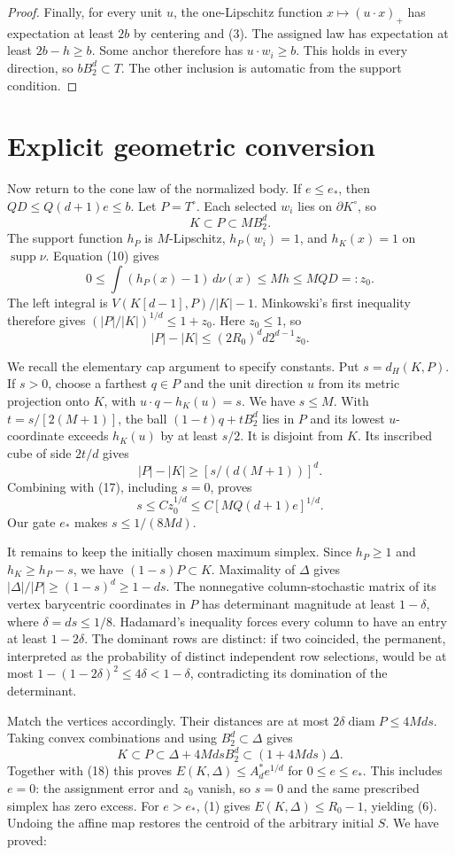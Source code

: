 \documentclass[11pt]{article}
\newcommand{\supp}{\operatorname{supp}}
\newcommand{\B}{B_2^d}
\newcommand{\pos}[1]{(#1)_+}
\begin{document}
\begin{proof}
Finally, for every unit $u$, the one-Lipschitz function $x\mapsto\pos{u\cdot x}$
has expectation at least $2b$ by centering and (3). The assigned law has
expectation at least $2b-h\ge b$. Some anchor therefore has $u\cdot w_i\ge b$.
This holds in every direction, so $b\B\subset T$. The other inclusion is
automatic from the support condition.
\end{proof}

\section{Explicit geometric conversion}

Now return to the cone law of the normalized body. If $e\le e_*$, then
$QD\le Q(d+1)e\le b$. Let $P=T^\circ$. Each selected $w_i$ lies on
$\partial K^\circ$, so
\[
 K\subset P\subset M\B.
 \tag{15}
\]
The support function $h_P$ is $M$-Lipschitz, $h_P(w_i)=1$, and
$h_K(x)=1$ on $\supp\nu$. Equation (10) gives
\[
 0\le\int(h_P(x)-1)\,d\nu(x)\le Mh\le MQD=:z_0.
 \tag{16}
\]
The left integral is $V(K[d-1],P)/|K|-1$. Minkowski's first inequality
therefore gives $(|P|/|K|)^{1/d}\le1+z_0$. Here $z_0\le1$, so
\[
 |P|-|K|\le(2R_0)^d d2^{d-1}z_0.
 \tag{17}
\]

We recall the elementary cap argument to specify constants. Put
$s=d_H(K,P)$. If $s>0$, choose a farthest $q\in P$ and the unit direction
$u$ from its metric projection onto $K$, with
$u\cdot q-h_K(u)=s$. We have $s\le M$. With $t=s/[2(M+1)]$, the ball
$(1-t)q+t\B$ lies in $P$ and its lowest $u$-coordinate exceeds $h_K(u)$
by at least $s/2$. It is disjoint from $K$. Its inscribed cube of side
$2t/d$ gives
\[
 |P|-|K|\ge[s/(d(M+1))]^d.
\]
Combining with (17), including $s=0$, proves
\[
 s\le C z_0^{1/d}\le C[MQ(d+1)e]^{1/d}.
 \tag{18}
\]
Our gate $e_*$ makes $s\le1/(8Md)$.

It remains to keep the initially chosen maximum simplex. Since $h_P\ge1$
and $h_K\ge h_P-s$, we have $(1-s)P\subset K$. Maximality of $\Delta$
gives $|\Delta|/|P|\ge(1-s)^d\ge1-ds$. The nonnegative column-stochastic
matrix of its vertex barycentric coordinates in $P$ has determinant
magnitude at least $1-\delta$, where $\delta=ds\le1/8$.
Hadamard's inequality forces every column to have an entry at least
$1-2\delta$. The dominant rows are distinct: if two coincided, the
permanent, interpreted as the probability of distinct independent row
selections, would be at most $1-(1-2\delta)^2\le4\delta<1-\delta$,
contradicting its domination of the determinant.

Match the vertices accordingly. Their distances are at most
$2\delta\operatorname{diam}P\le4Md s$. Taking convex combinations and
using $\B\subset\Delta$ gives
\[
 K\subset P\subset\Delta+4Md s\B\subset(1+4Md s)\Delta.
\]
Together with (18) this proves $E(K,\Delta)\le A_d^*e^{1/d}$ for
$0\le e\le e_*$. This includes $e=0$: the assignment error and $z_0$ vanish,
so $s=0$ and the same prescribed simplex has zero excess. For $e>e_*$,
(1) gives $E(K,\Delta)\le R_0-1$, yielding (6). Undoing the affine map
restores the centroid of the arbitrary initial $S$. We have proved:
\end{document}
